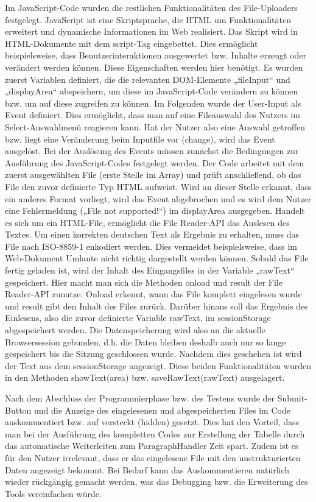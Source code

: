 Im JavaScript-Code wurden die restlichen Funktionalitäten des File-Uploaders festgelegt. JavaScript ist eine Skriptsprache, die HTML um Funktionalitäten erweitert und dynamische Informationen im Web realisiert. Das Skript wird in HTML-Dokumente mit dem script-Tag eingebettet. Dies ermöglicht beispielsweise, dass Benutzerinteraktionen ausgewertet bzw. Inhalte erzeugt oder verändert werden können. Diese Eigenschaften werden hier benötigt. Es wurden zuerst Variablen definiert, die die relevanten DOM-Elemente „fileInput“ und „displayArea“ abspeichern, um diese im JavaScript-Code verändern zu können bzw. um auf diese zugreifen zu können. Im Folgenden wurde der User-Input als Event definiert. Dies ermöglicht, dass man auf eine Fileauswahl des Nutzers im Select-Auswahlmenü reagieren kann. Hat der Nutzer also eine Auswahl getroffen bzw. liegt eine Veränderung beim Inputfile vor (change), wird das Event ausgelöst. Bei der Auslösung des Events müssen zunächst die Bedingungen zur Ausführung des JavaScript-Codes festgelegt werden. Der Code arbeitet mit dem zuerst ausgewählten File (erste Stelle im Array) und prüft anschließend, ob das File den zuvor definierte Typ HTML aufweist. Wird an dieser Stelle erkannt, dass ein anderes Format vorliegt, wird das Event abgebrochen und es wird dem Nutzer eine Fehlermeldung („File not supported!“) im displayArea ausgegeben. Handelt es sich um ein HTML-File, ermöglicht die File Reader-\ac{API} das Auslesen des Textes. Um einen korrekten deutschen Text als Ergebnis zu erhalten, muss das File nach ISO-8859-1 enkodiert werden. Dies vermeidet beispielsweise, dass im Web-Dokument Umlaute nicht richtig dargestellt werden können. Sobald das File fertig geladen ist, wird der Inhalt des Eingangsfiles in der Variable „rawText“ gespeichert. Hier macht man sich die Methoden onload und result der File Reader-API zunutze. Onload erkennt, wann das File komplett eingelesen wurde und result gibt den Inhalt des Files zurück. Darüber hinaus soll das Ergebnis des Einlesens, also die zuvor definierte Variable rawText, im sessionStorage abgespeichert werden. Die Datenspeicherung wird also an die aktuelle Browsersession gebunden, d.h. die Daten bleiben deshalb auch nur so lange gespeichert bis die Sitzung geschlossen wurde. Nachdem dies geschehen ist wird der Text aus dem sessionStorage angezeigt. Diese beiden Funktionalitäten wurden in den Methoden showText(area) bzw. saveRawText(rawText) ausgelagert. 

 Nach dem Abschluss der Programmierphase bzw. des Testens wurde der Submit-Button und die Anzeige des eingelesenen und abgespeicherten Files im Code auskommentiert bzw. auf versteckt (hidden) gesetzt. Dies hat den Vorteil, dass man bei der Ausführung des kompletten Codes zur Erstellung der Tabelle durch das automatische Weiterleiten zum ParagraphHandler Zeit spart. Zudem ist es für den Nutzer irrelevant, dass er das eingelesene File mit den unstrukturierten Daten angezeigt bekommt. Bei Bedarf kann das Auskommentieren natürlich wieder rückgängig gemacht werden, was das Debugging bzw. die Erweiterung des Tools vereinfachen würde. 

